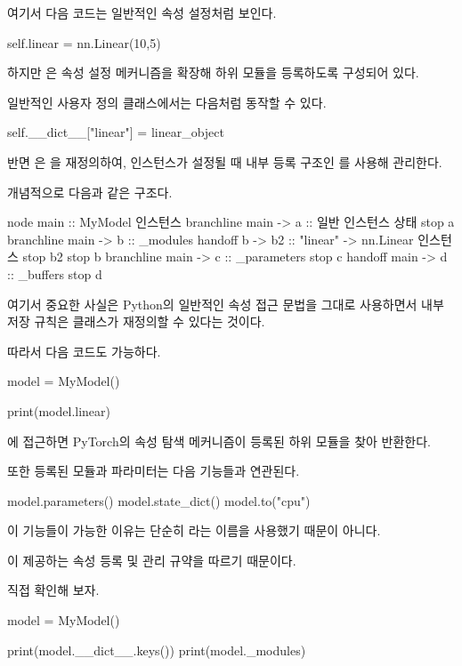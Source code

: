 여기서 다음 코드는 일반적인 속성 설정처럼 보인다.

\begin{dhkcode}
self.linear = nn.Linear(10,5)
\end{dhkcode}

하지만 은 속성 설정 메커니즘을 확장해 하위 모듈을 등록하도록 구성되어 있다.

일반적인 사용자 정의 클래스에서는 다음처럼 동작할 수 있다.

\begin{dhkcode}
self.__dict__["linear"] = linear_object
\end{dhkcode}

반면 은 을 재정의하여,  인스턴스가 설정될 때 내부 등록 구조인 를 사용해 관리한다.

개념적으로 다음과 같은 구조다.

\begin{dhkbranch}[in=8]
node main :: MyModel 인스턴스
branchline main -> a :: 일반 인스턴스 상태
stop a
branchline main -> b :: _modules
handoff b -> b2 :: "linear" -> nn.Linear 인스턴스
stop b2
stop b
branchline main -> c :: _parameters
stop c
handoff main -> d :: _buffers
stop d
\end{dhkbranch}

여기서 중요한 사실은 Python의 일반적인 속성 접근 문법을 그대로 사용하면서 내부 저장 규칙은 클래스가 재정의할 수 있다는 것이다.

따라서 다음 코드도 가능하다.

\begin{dhkcode}
model = MyModel()

print(model.linear)
\end{dhkcode}

에 접근하면 PyTorch의 속성 탐색 메커니즘이 등록된 하위 모듈을 찾아 반환한다.

또한 등록된 모듈과 파라미터는 다음 기능들과 연관된다.

\begin{dhkcode}
model.parameters()
model.state_dict()
model.to("cpu")
\end{dhkcode}

이 기능들이 가능한 이유는 단순히 라는 이름을 사용했기 때문이 아니다.

이 제공하는 속성 등록 및 관리 규약을 따르기 때문이다.

직접 확인해 보자.

\begin{dhkcode}
model = MyModel()

print(model.__dict__.keys())
print(model._modules)
\end{dhkcode}

